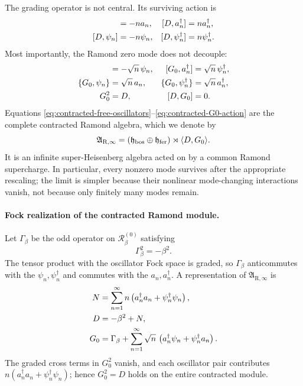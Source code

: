 \documentclass[11pt]{article}
\newcommand{\R}{\mathrm{R}}
\begin{document}
The grading operator is not central.  Its surviving action is
\begin{align}
 [D,a_n]&=-n a_n,
 & [D,a_n^\dagger]&=n a_n^\dagger,
 \notag\\
 [D,\psi_n]&=-n\psi_n,
 & [D,\psi_n^\dagger]&=n\psi_n^\dagger.
 \label{eq:contracted-D-action}
\end{align}
Most importantly, the Ramond zero mode does not decouple:
\begin{align}
 [G_0,a_n]&=-\sqrt n\,\psi_n,
 &
 [G_0,a_n^\dagger]&=\sqrt n\,\psi_n^\dagger,
 \notag\\
 \{G_0,\psi_n\}&=\sqrt n\,a_n,
 &
 \{G_0,\psi_n^\dagger\}&=\sqrt n\,a_n^\dagger,
 \notag\\
 G_0^2&=D,
 & [D,G_0]&=0.
 \label{eq:contracted-G0-action}
\end{align}
Equations
\eqref{eq:contracted-free-oscillators}--\eqref{eq:contracted-G0-action}
are the complete contracted Ramond algebra, which we denote by
\begin{equation}
 \mathfrak A_{\R,\infty}
 =
 \left(
 \mathfrak h_{\rm bos}\oplus\mathfrak h_{\rm fer}
 \right)\rtimes\langle D,G_0\rangle .
 \label{eq:contracted-r-algebra-name}
\end{equation}
It is an infinite super-Heisenberg algebra acted on by a common Ramond
supercharge.  In particular, every nonzero mode survives after the
appropriate rescaling; the limit is simpler because their nonlinear
mode-changing interactions vanish, not because only finitely many modes
remain.

\paragraph{Fock realization of the contracted Ramond module.}
Let \(\Gamma_\beta\) be the odd operator on
\(\mathcal R_\beta^{(0)}\) satisfying
\begin{equation}
 \Gamma_\beta^2=-\beta^2.
 \label{eq:contracted-ground-clifford}
\end{equation}
The tensor product with the oscillator Fock space is graded, so
\(\Gamma_\beta\) anticommutes with the \(\psi_n,\psi_n^\dagger\) and
commutes with the \(a_n,a_n^\dagger\).  A representation of
\(\mathfrak A_{\R,\infty}\) is
\begin{align}
 N&=
 \sum_{n=1}^{\infty}n
 \left(a_n^\dagger a_n+\psi_n^\dagger\psi_n\right),
 \notag\\
 D&=-\beta^2+N,
 \notag\\
 G_0&=
 \Gamma_\beta+
 \sum_{n=1}^{\infty}\sqrt n\,
 \left(a_n^\dagger\psi_n+\psi_n^\dagger a_n\right).
 \label{eq:contracted-fock-realization}
\end{align}
The graded cross terms in \(G_0^2\) vanish, and each oscillator pair
contributes
\(n(a_n^\dagger a_n+\psi_n^\dagger\psi_n)\); hence
\(G_0^2=D\) holds on the entire contracted module.
\end{document}
